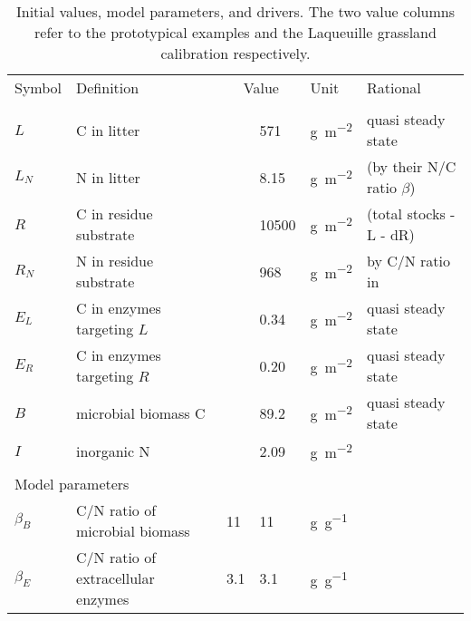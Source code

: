 % 

\begin{table}[t]
\caption{
\label{tab:modelParameters}
Initial values, model parameters, and drivers. The two value
columns refer to the prototypical examples and the Laqueuille grassland
calibration respectively. }
\vskip4mm
\centering
\begin{tabular}{lp{6cm}lllp{5.5cm}}
\tophline
Symbol &  Definition & \multicolumn{2}{c}{Value} & Unit & Rational \\
\middlehline
\multicolumn{6}{l}{State variables}  \\
$L$ &  C in litter & & 571 & \unit{g~m^{-2}} & quasi steady state 
\\
$L_N$ &  N in litter & & 8.15 & \unit{g~m^{-2}} & \citep{Perveen14}
(by their N/C ratio $\beta$)
\\
$R$ &  C in residue substrate & & 10500 & \unit{g~m^{-2}} &
\citep{Allard07} (total stocks - L - dR)
\\
$R_N$ &  N in residue substrate & & 968 & \unit{g~m^{-2}} & by C/N
ratio in \citep{Perveen14} \\
$E_L$ &  C in enzymes targeting $L$ & & 0.34 & \unit{g~m^{-2}} & 
quasi steady state \\
$E_R$ &  C in enzymes targeting $R$ & & 0.20 & \unit{g~m^{-2}} & 
quasi steady state \\
$B$ & microbial biomass C & & 89.2 & \unit{g~m^{-2}} &  quasi steady
state \\
$I$ & inorganic N & & 2.09 & \unit{g~m^{-2}} & \citep{Perveen14} \\
\\
\multicolumn{6}{l}{Model parameters}  \\
$\beta_B$ &  C/N ratio of microbial biomass & 11 & 11& \unit{g~g^{-1}} &
\citep{Perveen14} 
\\
$\beta_E$ &  C/N ratio of extracellular enzymes & 3.1 & 3.1 &
\unit{g~g^{-1}} & \citep{Sterner02} \\

\end{tabular}
\end{table}
